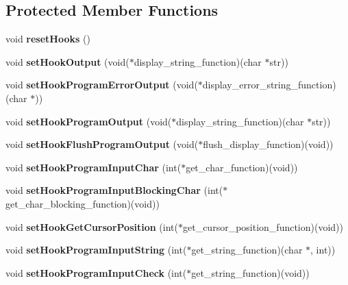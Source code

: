 \subsection*{Protected Member Functions}
\begin{DoxyCompactItemize}
\item 
\mbox{\label{class_g_a_u_s_s_a0df033134e600e217a18a1db1e64158c}} 
void {\bfseries reset\+Hooks} ()
\item 
\mbox{\label{class_g_a_u_s_s_a1b95254f8cfd40f1b4b3e098bd606369}} 
void {\bfseries set\+Hook\+Output} (void($\ast$display\+\_\+string\+\_\+function)(char $\ast$str))
\item 
\mbox{\label{class_g_a_u_s_s_af3ff563e38e98ddb4ea541de7279f44f}} 
void {\bfseries set\+Hook\+Program\+Error\+Output} (void($\ast$display\+\_\+error\+\_\+string\+\_\+function)(char $\ast$))
\item 
\mbox{\label{class_g_a_u_s_s_aa9782a669facb214976b23b0657e4fef}} 
void {\bfseries set\+Hook\+Program\+Output} (void($\ast$display\+\_\+string\+\_\+function)(char $\ast$str))
\item 
\mbox{\label{class_g_a_u_s_s_a49a63932fa65fe93e15065dcfca89b8a}} 
void {\bfseries set\+Hook\+Flush\+Program\+Output} (void($\ast$flush\+\_\+display\+\_\+function)(void))
\item 
\mbox{\label{class_g_a_u_s_s_a775d891a6cd5cd84f342db216b46826c}} 
void {\bfseries set\+Hook\+Program\+Input\+Char} (int($\ast$get\+\_\+char\+\_\+function)(void))
\item 
\mbox{\label{class_g_a_u_s_s_ab85b990c0e16e85e9045f40a73b641cb}} 
void {\bfseries set\+Hook\+Program\+Input\+Blocking\+Char} (int($\ast$get\+\_\+char\+\_\+blocking\+\_\+function)(void))
\item 
\mbox{\label{class_g_a_u_s_s_a492a18c9aa67bd11f145a40be85609a6}} 
void {\bfseries set\+Hook\+Get\+Cursor\+Position} (int($\ast$get\+\_\+cursor\+\_\+position\+\_\+function)(void))
\item 
\mbox{\label{class_g_a_u_s_s_ae3f5de6a0e0c2b5caf64e8612b353797}} 
void {\bfseries set\+Hook\+Program\+Input\+String} (int($\ast$get\+\_\+string\+\_\+function)(char $\ast$, int))
\item 
\mbox{\label{class_g_a_u_s_s_a3231521365d093e05eec48bde7f25b7f}} 
void {\bfseries set\+Hook\+Program\+Input\+Check} (int($\ast$get\+\_\+string\+\_\+function)(void))
\end{DoxyCompactItemize}


